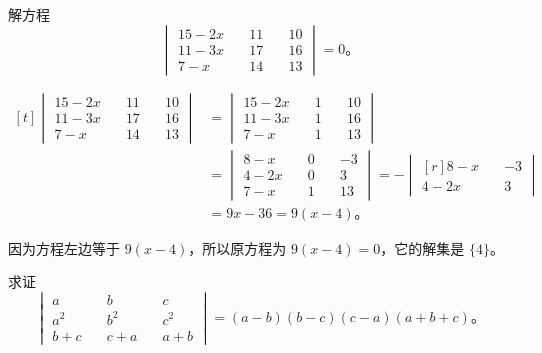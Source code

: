 \liti 解方程
$$
\begin{vmatrix}
    15 - 2x \quad & 11 \quad & 10 \\
    11 - 3x \quad & 17 \quad & 16 \\
     7 - x  \quad & 14 \quad & 13
\end{vmatrix} = 0 \text{。}
$$

\jie $\begin{aligned}[t]
    \begin{vmatrix}
        15 - 2x \quad & 11 \quad & 10 \\
        11 - 3x \quad & 17 \quad & 16 \\
        7 - x   \quad & 14 \quad & 13
    \end{vmatrix}
    &=  \begin{vmatrix}
            15 - 2x \quad & 1 \quad & 10 \\
            11 - 3x \quad & 1 \quad & 16 \\
            7 - x   \quad & 1 \quad & 13
        \end{vmatrix} \\
    &=  \begin{vmatrix}
            8 - x  \quad & 0 \quad & -3 \\
            4 - 2x \quad & 0 \quad & 3 \\
            7 - x  \quad & 1 \quad & 13
        \end{vmatrix}
    =  -\begin{vmatrix*}[r]
            8 - x  \quad & -3 \\
            4 - 2x \quad & 3
        \end{vmatrix*} \\
    &= 9x - 36 = 9(x - 4) \text{。}
\end{aligned}$

因为方程左边等于 $9(x - 4)$，所以原方程为 $9(x - 4) = 0$，它的解集是 $\{ 4  \}$。



\liti 求证
$$
\begin{vmatrix}
    a     \quad & b     \quad & c \\
    a^2   \quad & b^2   \quad & c^2 \\
    b + c \quad & c + a \quad & a + b
\end{vmatrix} = (a - b)(b - c)(c - a)(a + b + c) \text{。}
$$

